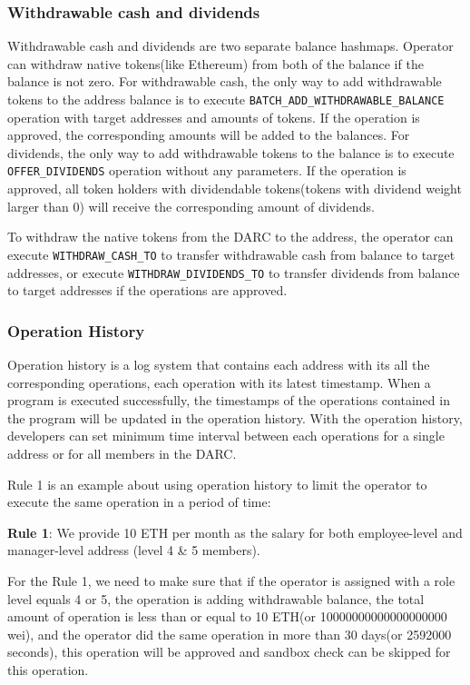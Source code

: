 \documentclass[main.tex]{subfiles}
\begin{document}
\subsubsection{Withdrawable cash and dividends}

Withdrawable cash and dividends are two separate balance hashmaps. Operator can withdraw native tokens(like Ethereum) from both of the balance if the balance is not zero. For withdrawable cash, the only way to add withdrawable tokens to the address balance is to execute \texttt{BATCH\_ADD\_WITHDRAWABLE\_BALANCE} operation with target addresses and amounts of tokens. If the operation is approved, the corresponding amounts will be added to the balances. For dividends, the only way to add withdrawable tokens to the balance is to execute \texttt{OFFER\_DIVIDENDS} operation without any parameters. If the operation is approved, all token holders with dividendable tokens(tokens with dividend weight larger than 0) will receive the corresponding amount of dividends.

To withdraw the native tokens from the DARC to the address, the operator can execute \texttt{WITHDRAW\_CASH\_TO} to transfer withdrawable cash from balance to target addresses, or execute \texttt{WITHDRAW\_DIVIDENDS\_TO} to transfer dividends from balance to target addresses if the operations are approved.

\subsubsection{Operation History}

Operation history is a log system that contains each address with its all the corresponding operations, each operation with its latest timestamp. When a program is executed successfully, the timestamps of the operations contained in the program will be updated in the operation history. With the operation history, developers can set minimum time interval between each operations for a single address or for all members in the DARC.

Rule 1 is an example about using operation history to limit the operator to execute the same operation in a period of time:

\textbf{Rule 1}: We provide 10 ETH per month as the salary for both employee-level and manager-level address (level 4 \& 5 members).


For the Rule 1, we need to make sure that if the operator is assigned with a role level equals 4 or 5, the operation is adding withdrawable balance, the total amount of operation is less than or equal to 10 ETH(or 10000000000000000000 wei), and the operator did the same operation in more than 30 days(or 2592000 seconds), this operation will be approved and sandbox check can be skipped for this operation.
\end{document}

